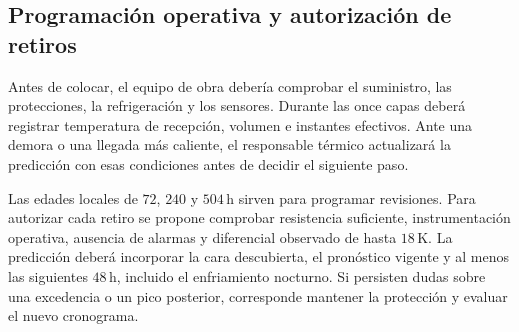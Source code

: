 \subsection{Programación operativa y autorización de retiros}
Antes de colocar, el equipo de obra debería comprobar el suministro, las protecciones, la refrigeración y los sensores. Durante las once capas deberá registrar temperatura de recepción, volumen e instantes efectivos. Ante una demora o una llegada más caliente, el responsable térmico actualizará la predicción con esas condiciones antes de decidir el siguiente paso.

Las edades locales de $72$, $240$ y $504\,\mathrm h$ sirven para programar revisiones. Para autorizar cada retiro se propone comprobar resistencia suficiente, instrumentación operativa, ausencia de alarmas y diferencial observado de hasta $18\,\mathrm K$. La predicción deberá incorporar la cara descubierta, el pronóstico vigente y al menos las siguientes $48\,\mathrm h$, incluido el enfriamiento nocturno. Si persisten dudas sobre una excedencia o un pico posterior, corresponde mantener la protección y evaluar el nuevo cronograma.

